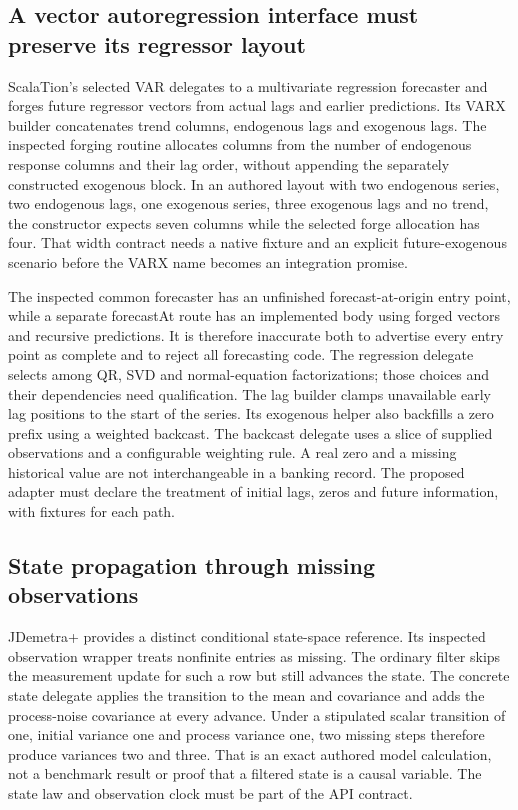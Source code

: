 \subsection{A vector autoregression interface must preserve its regressor layout}

ScalaTion's selected VAR delegates to a multivariate regression forecaster and forges future regressor vectors from actual lags and earlier predictions. Its VARX builder concatenates trend columns, endogenous lags and exogenous lags. The inspected forging routine allocates columns from the number of endogenous response columns and their lag order, without appending the separately constructed exogenous block. In an authored layout with two endogenous series, two endogenous lags, one exogenous series, three exogenous lags and no trend, the constructor expects seven columns while the selected forge allocation has four. That width contract needs a native fixture and an explicit future-exogenous scenario before the VARX name becomes an integration promise.~\citep{exec25_jdyn_scalation,exec25_jdyn_choice}

The inspected common forecaster has an unfinished forecast-at-origin entry point, while a separate forecastAt route has an implemented body using forged vectors and recursive predictions. It is therefore inaccurate both to advertise every entry point as complete and to reject all forecasting code. The regression delegate selects among QR, SVD and normal-equation factorizations; those choices and their dependencies need qualification. The lag builder clamps unavailable early lag positions to the start of the series. Its exogenous helper also backfills a zero prefix using a weighted backcast. The backcast delegate uses a slice of supplied observations and a configurable weighting rule. A real zero and a missing historical value are not interchangeable in a banking record. The proposed adapter must declare the treatment of initial lags, zeros and future information, with fixtures for each path.~\citep{exec25_jdyn_scalation}

\subsection{State propagation through missing observations}

JDemetra+ provides a distinct conditional state-space reference. Its inspected observation wrapper treats nonfinite entries as missing. The ordinary filter skips the measurement update for such a row but still advances the state. The concrete state delegate applies the transition to the mean and covariance and adds the process-noise covariance at every advance. Under a stipulated scalar transition of one, initial variance one and process variance one, two missing steps therefore produce variances two and three. That is an exact authored model calculation, not a benchmark result or proof that a filtered state is a causal variable. The state law and observation clock must be part of the API contract.~\citep{exec25_jdyn_jdplus,exec25_jdyn_choice}

